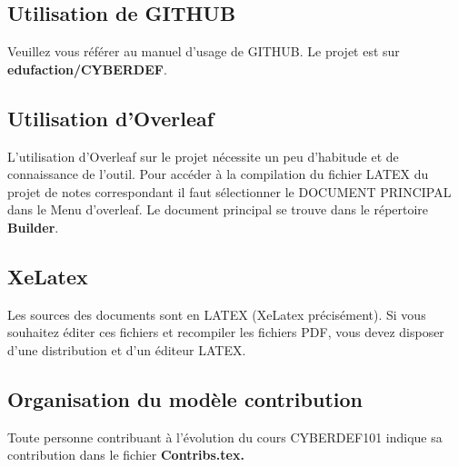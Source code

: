 \subsection{Utilisation de GITHUB}

Veuillez vous référer au manuel d'usage de GITHUB. Le projet est sur \textbf{edufaction/CYBERDEF}.

\subsection{Utilisation d'Overleaf}

L'utilisation d'Overleaf sur le projet nécessite un peu d'habitude et de connaissance de l'outil. Pour accéder à la compilation du fichier LATEX du projet de notes correspondant il faut sélectionner le DOCUMENT PRINCIPAL dans le Menu d'overleaf. Le document principal se trouve dans le répertoire \textbf{Builder}.

\subsection{XeLatex}

Les sources des documents sont en LATEX (XeLatex précisément). Si vous souhaitez éditer ces fichiers et recompiler les fichiers PDF, vous devez disposer d'une distribution et d'un éditeur LATEX.





\subsection{Organisation du modèle contribution}

Toute personne contribuant à l'évolution du cours CYBERDEF101 indique sa contribution dans le fichier \bf{Contribs.tex}.